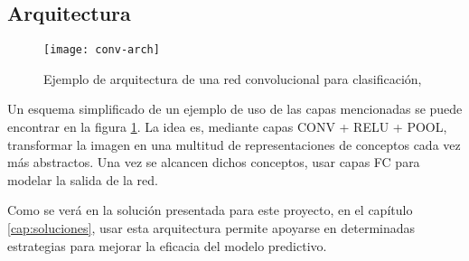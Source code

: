 \subsection{Arquitectura}
\label{sec:conv-net-arch}

\begin{figure}
    \centering
    \caption{Ejemplo de arquitectura de una red convolucional para clasificación, \parencite{clarifai}}
\label{conv-arch}
  \texttt{[image: conv-arch]}
\end{figure}

Un esquema simplificado de un ejemplo de uso de las capas mencionadas se puede encontrar en la figura \ref{conv-arch}. La idea es, mediante capas CONV + RELU + POOL, transformar la imagen en una multitud de representaciones de conceptos cada vez más abstractos. Una vez se alcancen dichos conceptos, usar capas FC para modelar la salida de la red.

Como se verá en la solución presentada para este proyecto, en el capítulo \ref{cap:soluciones}, usar esta arquitectura permite apoyarse en determinadas estrategias para mejorar la eficacia del modelo predictivo.
